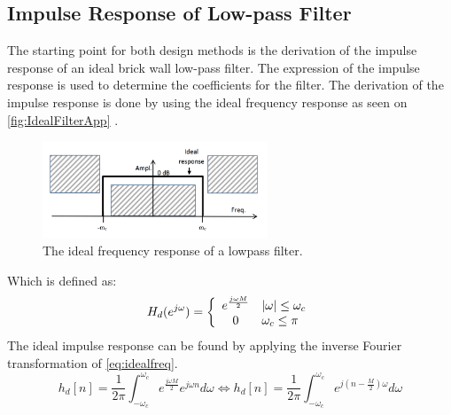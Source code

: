 \subsection*{Impulse Response of Low-pass Filter}
The starting point for both design methods is the derivation of the impulse response of an ideal brick wall low-pass filter. The expression of the impulse response is used to determine the coefficients for the filter. The derivation of the impulse response is done by using the ideal frequency response as seen on \autoref{fig:IdealFilterApp} \citep{sou:FIRpart4}. 
\begin{figure}[H]
\centering
\includegraphics[width=0.6\textwidth]{figures/Ideal_filter.png}
\caption{The ideal frequency response of a lowpass filter.}
\label{fig:IdealFilterApp}
\end{figure}
Which is defined as:
\begin{equation} \label{eq:idealfreq}
H_d(e^{j\omega})=\left\{
\begin{array}{c l}      
    e^{\frac{j\omega M}{2}} & |\omega|\leq\omega_c\\
    0 & \omega_c\leq\pi
\end{array}\right.
\end{equation}
The ideal impulse response can be found by applying the inverse Fourier transformation of \autoref{eq:idealfreq}.
\begin{equation}
h_d[n]=\frac{1}{2\pi}\int_{-\omega_c}^{\omega_c}e^{\frac{j\omega M}{2}} e^{j\omega n} d\omega \Leftrightarrow h_d[n]=\frac{1}{2\pi}\int_{-\omega_c}^{\omega_c}e^{j(n-\frac{M}{2})\omega} d\omega
\end{equation}

